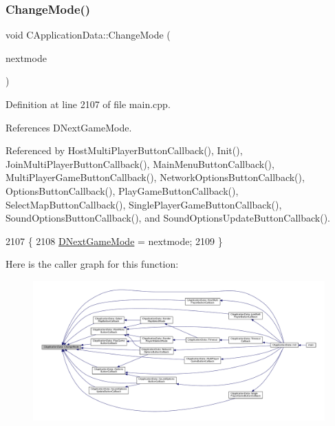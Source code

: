 \subsubsection{\texorpdfstring{Change\+Mode()}{ChangeMode()}}
{\footnotesize\ttfamily void C\+Application\+Data\+::\+Change\+Mode (\begin{DoxyParamCaption}\item[{\hyperlink{classCApplicationData_ac8ac37a4c8bb871036fbbdc6a072e403}{E\+Game\+Mode}}]{nextmode }\end{DoxyParamCaption})\hspace{0.3cm}{\ttfamily [protected]}}



Definition at line 2107 of file main.\+cpp.



References D\+Next\+Game\+Mode.



Referenced by Host\+Multi\+Player\+Button\+Callback(), Init(), Join\+Multi\+Player\+Button\+Callback(), Main\+Menu\+Button\+Callback(), Multi\+Player\+Game\+Button\+Callback(), Network\+Options\+Button\+Callback(), Options\+Button\+Callback(), Play\+Game\+Button\+Callback(), Select\+Map\+Button\+Callback(), Single\+Player\+Game\+Button\+Callback(), Sound\+Options\+Button\+Callback(), and Sound\+Options\+Update\+Button\+Callback().


\begin{DoxyCode}
2107                                                    \{
2108     \hyperlink{classCApplicationData_a3b67edeacd70201dcf96fa9fa8aa2107}{DNextGameMode} = nextmode;
2109 \}
\end{DoxyCode}
Here is the caller graph for this function\+:\nopagebreak
\begin{figure}[H]
\begin{center}
\leavevmode
\includegraphics[width=350pt]{classCApplicationData_aee18c113e9a0acb3cad3d63eb19de71b_icgraph}
\end{center}
\end{figure}
\hypertarget{classCApplicationData_ae7516e29f629998e4068ae1584d0237c}{}\label{classCApplicationData_ae7516e29f629998e4068ae1584d0237c} 
